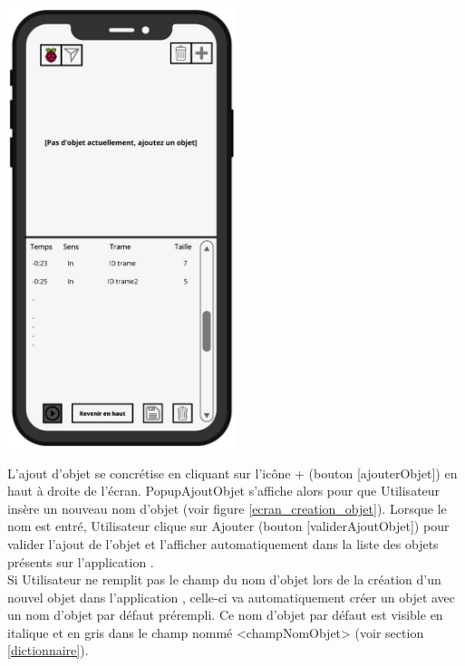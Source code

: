 \begin{minipage}{0.9\linewidth}
    \centering
    \includegraphics[width=0.5\textwidth]{sections/3_Exigences_specifiques/1_IHM/ihm/ecranPrincipalSansObjet.png}
    \label{ecran_sans_objet}
\end{minipage}\hfill 

\newpage

L'ajout d'objet se concrétise en cliquant sur l'icône {\guillemetleft} + {\guillemetright} (bouton [ajouterObjet]) en haut à droite de l'écran. PopupAjoutObjet s'affiche alors pour que Utilisateur insère un nouveau nom d'objet (voir figure \ref{ecran_creation_objet}). Lorsque le nom est entré, Utilisateur clique sur {\guillemetleft} Ajouter {\guillemetright} (bouton [validerAjoutObjet]) pour valider l'ajout de l'objet et l'afficher automatiquement dans la liste des objets présents sur l'application {\nomApplication}. \newline \\ 
Si Utilisateur ne remplit pas le champ du nom d'objet lors de la création d'un nouvel objet dans l'application {\nomApplication}, celle-ci va automatiquement créer un objet avec un nom d'objet par défaut prérempli. Ce nom d'objet par défaut est visible en italique et en gris dans le champ nommé <champNomObjet> (voir section \ref{dictionnaire}). \\


